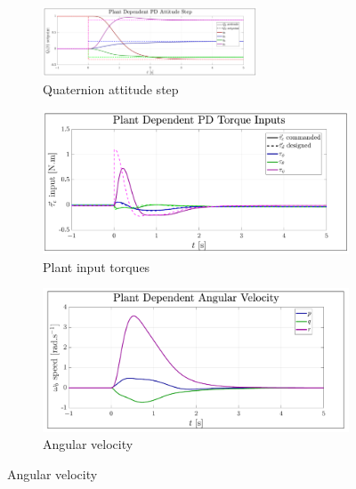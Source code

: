 \begin{figure}[htbp]
\vspace{-10pt}
\centering
\begin{subfigure}{\textwidth}
\centering
\includegraphics[width=0.7\textwidth]{graphs/PD_Diagonal_Dependent_Step}
\vspace{-6pt}
\caption{Quaternion attitude step}
\label{fig:PD_Diagonal_Dependent_Step}
\end{subfigure}
\begin{subfigure}{0.49\textwidth}
\centering
\includegraphics[width=\textwidth]{graphs/PD_Diagonal_Dependent_Torque}
\vspace{-20pt}
\caption{Plant input torques}
\label{fig:PD_Diagonal_Dependent_Torque}
\end{subfigure}
\begin{subfigure}{0.49\textwidth}
\centering
\includegraphics[width=\textwidth]{graphs/PD_Diagonal_Dependent_Angular}
\vspace{-20pt}
\caption{Angular velocity}

\end{subfigure}
\end{figure}
